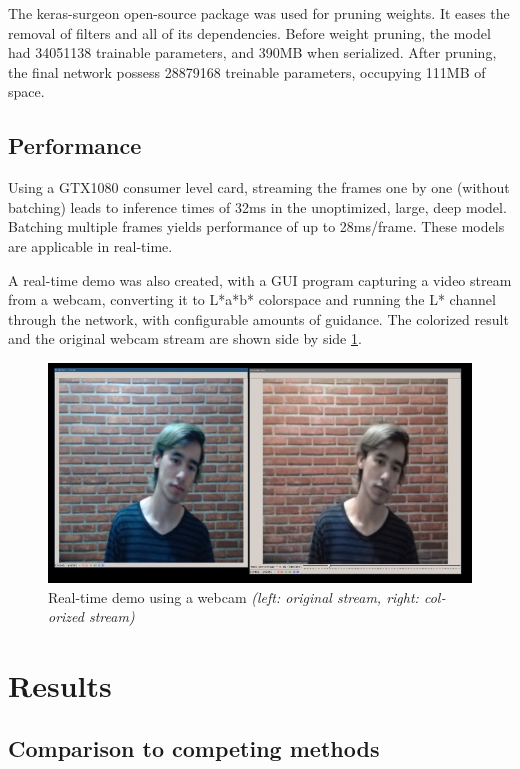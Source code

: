 \documentclass[12pt,openright,oneside,a4paper,english]{abntex2}
\begin{document}
\begin{otherlanguage}{english}
    The keras-surgeon \cite{keras_surgeon} open-source package was used for pruning weights. It eases the removal of filters and all of its dependencies. Before weight pruning, the model had 34051138 trainable parameters, and 390MB when serialized. After pruning, the final network possess 28879168 treinable parameters, occupying 111MB of space.

    \section{Performance}
    Using a GTX1080 consumer level card, streaming the frames one by one (without batching) leads to inference times of 32ms in the unoptimized, large, deep model. Batching multiple frames yields performance of up to 28ms/frame. These models are applicable in real-time.

    A real-time demo was also created, with a GUI program capturing a video stream from a webcam, converting it to L*a*b* colorspace and running the L* channel through the network, with configurable amounts of guidance. The colorized result and the original webcam stream are shown side by side \ref{fig:webcam}.

    \begin{figure}[H]
    \centering
    \includegraphics[width=\textwidth+20pt]{webcam}
    \caption{Real-time demo using a webcam \textit{(left: original stream, right: colorized stream)}}
    \label{fig:webcam}
    \end{figure}

    \chapter{Results}

    \section{Comparison to competing methods}


\end{otherlanguage}
\end{document}
